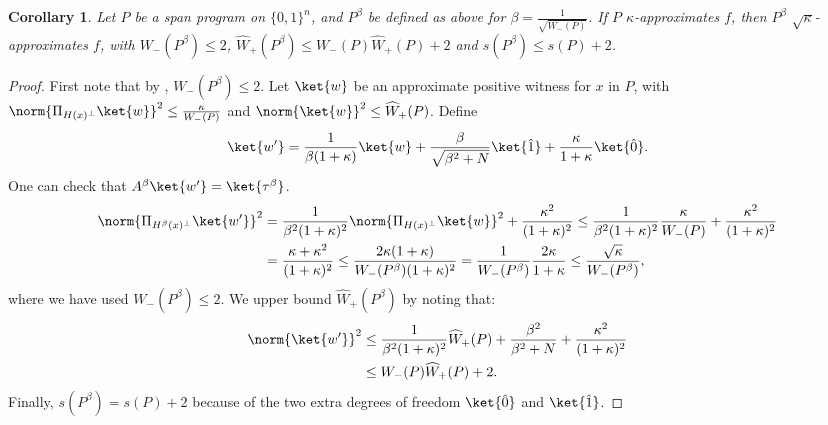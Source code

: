 \documentclass[11pt]{article}
\numberwithin{equation}{section}
\newtheorem{corollary}[theorem]{Corollary}
\theoremstyle{definition}
\theoremstyle{plain}
\begin{document}
\begin{corollary}\label{cor:scaling}
Let $P$ be a span program on $\{0,1\}^n$, and $P^\beta$ be defined as above for $\beta=\frac{1}{\sqrt{W_-(P)}}$. If $P$ $\kappa$-approximates $f$, then $P^\beta$ $\sqrt{\kappa}$-approximates $f$, with $W_-(P^
\beta)\leq 2$, $\widehat{W}_+(P^\beta)\leq W_-(P)\widehat{W}_+(P)+2$ and $s(P^{\beta})\leq s(P)+2$.
\end{corollary}
\begin{proof}
First note that by , $W_-(P^\beta)\leq 2$.
Let $\ket{w}$ be an approximate positive witness for $x$ in $P$, with $\norm{\Pi_{H(x)^\bot}\ket{w}}^2\leq\frac{\kappa}{W_-(P)}$ and $\norm{\ket{w}}^2\leq \widehat{W}_+(P)$. Define 
$$\ket{w'}=\frac{1}{\beta(1+\kappa)}\ket{w}+\frac{\beta}{\sqrt{\beta^2+N}}\ket{\hat{1}}+\frac{\kappa}{1+\kappa}\ket{\hat{0}}.$$
One can check that $A^\beta\ket{w'}=\ket{\tau^\beta}$. 
\begin{align*}
\norm{\Pi_{H^\beta(x)^\bot}\ket{w'}}^2 & =\frac{1}{\beta^2(1+\kappa)^2}\norm{\Pi_{H(x)^\bot}\ket{w}}^2+\frac{\kappa^2}{(1+\kappa)^2} 
\leq  \frac{1}{\beta^2(1+\kappa)^2}\frac{\kappa}{W_-(P)}+\frac{\kappa^2}{(1+\kappa)^2}\\
&= \frac{\kappa+\kappa^2}{(1+\kappa)^2}\leq \frac{2\kappa(1+\kappa)}{W_-(P^\beta)(1+\kappa)^2} = \frac{1}{W_-(P^\beta)}\frac{2\kappa}{1+\kappa}\leq \frac{\sqrt{\kappa}}{W_-(P^\beta)},
\end{align*}
where we have used $W_-(P^\beta)\leq 2$. We upper bound $\widehat{W}_+(P^\beta)$ by noting that:
\begin{align*}
\norm{\ket{w'}}^2 &\leq  \frac{1}{\beta^2(1+\kappa)^2}\widehat{W}_+(P)+\frac{\beta^2}{\beta^2+N}+\frac{\kappa^2}{(1+\kappa)^2}\\
&\leq W_-(P)\widehat{W}_+(P)+2. 
\end{align*}
Finally, $s(P^\beta)=s(P)+2$ because of the two extra degrees of freedom $\ket{\hat{0}}$ and $\ket{\hat{1}}$.
\end{proof}
\end{document}
